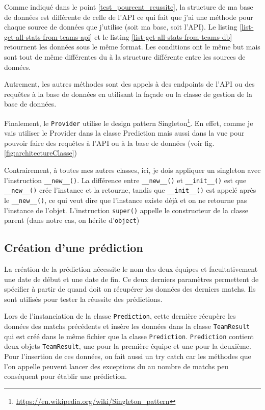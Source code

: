 \documentclass[a4paper,14pt]{extarticle}
\begin{document}
{\newpage


Comme indiqué dans le point \ref{test_pourcent_reussite}, la structure de ma base de données est différente de celle de l'API ce qui fait que j'ai une méthode pour chaque source de données que j'utilise (soit ma base, soit l'API). Le listing \ref{list-get-all-stats-from-teams-api} et le listing \ref{list-get-all-stats-from-teams-db} retournent les données sous le même format. Les conditions ont le même but mais sont tout de même différentes du à la structure différente entre les sources de données. 

Autrement, les autres méthodes sont des appels à des endpoints de l'API ou des requêtes à la base de données en utilisant la façade ou la classe de gestion de la base de données.

Finalement, le \texttt{Provider} utilise le design pattern Singleton\footnote{\url{https://en.wikipedia.org/wiki/Singleton_pattern}}. En effet, comme je vais utiliser le Provider dans la classe Prediction mais aussi dans la vue pour pouvoir faire des requêtes à l'API ou à la base de données (voir fig. \ref{fig:architectureClasse})


Contrairement, à toutes mes autres classes, ici, je dois appliquer un singleton avec l'instruction \texttt{\_\_new\_\_()}. La différence entre \texttt{\_\_new\_\_()} et \texttt{\_\_init\_\_()} est que \texttt{\_\_new\_\_()} crée l'instance et la retourne, tandis que \texttt{\_\_init\_\_()} est appelé après le \texttt{\_\_new\_\_()}, ce qui veut dire que l'instance existe déjà et on ne retourne pas l'instance de l'objet. L'instruction \texttt{super()} appelle le constructeur de la classe parent (dans notre cas, on hérite d'\texttt{object})

\subsection{Création d'une prédiction}

La création de la prédiction nécessite le nom des deux équipes et facultativement une date de début et une date de fin. Ce deux derniers paramètres permettent de spécifier à partir de quand doit on récupérer les données des derniers matchs. Ils sont utilisés pour tester la réussite des prédictions.


Lors de l'instanciation de la classe \texttt{Prediction}, cette dernière récupère les données des matchs précédents et insère les données dans la classe \texttt{TeamResult} qui est créé dans le même fichier que la classe \texttt{Prediction}. \texttt{Prediction} contient deux objets \texttt{TeamResult}, une pour la première équipe et une pour la deuxième. Pour l'insertion de ces données, on fait aussi un try catch car les méthodes que l'on appelle peuvent lancer des exceptions du au nombre de matchs peu conséquent pour établir une prédiction.

}
\end{document}
